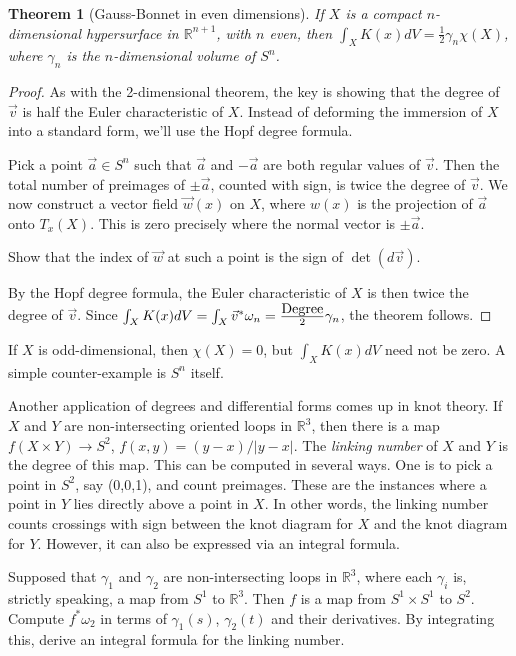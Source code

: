 \documentclass[12pt]{amsbook}
\newcommand{\R}{{\mathbb R}}
\newtheorem{thm}{Theorem}[section]
\theoremstyle{definition}
\begin{document}
\begin{thm}[Gauss-Bonnet in even dimensions] If $X$ is a compact $n$-dimensional hypersurface in $\R^{n+1}$, with $n$ even, then $\int_X K(x) dV =
\frac12 \gamma_n \chi(X)$, where $\gamma_n$ is the $n$-dimensional volume
of $S^n$. 
\end{thm}

\begin{proof} As with the 2-dimensional theorem, the key is showing that 
the degree of $\vec v$ is half the Euler characteristic of $X$. Instead of 
deforming the immersion of $X$ into a standard form, we'll use the Hopf 
degree formula. 

Pick a point $\vec a \in S^n$ such that $\vec a$ and $-\vec a$ 
are both regular values of 
$\vec v$. Then the total number of preimages of $\pm \vec a$, 
counted with sign,
is twice the degree of $\vec v$. We now construct a vector field $\vec w(x)$
on $X$, where $w(x)$ is the projection of $\vec a$ onto $T_x(X)$. This is 
zero precisely where the normal vector is $\pm \vec a$. 

 Show that the index of $\vec w$ at such a point is 
the sign of $\det (d \vec v)$. 

By the Hopf degree formula, the Euler characteristic of $X$ is then twice
the degree of $\vec v$. Since $\int_X K(x) dV = \int_X \vec v^* \omega_n
= \frac{\hbox{Degree}}{2} \gamma_n$, the theorem follows.

\end{proof}

If $X$ is odd-dimensional, then $\chi(X)=0$, but $\int_X K(x) dV$ need not
be zero. A simple counter-example is $S^n$ itself. 

Another application of degrees and differential forms comes up in knot 
theory.  If $X$ and $Y$ are
non-intersecting oriented loops in $\R^3$, then there is a map $f(X
\times Y) \to S^2$, $f(x,y) = (y-x)/|y-x|$. The {\em linking number}
of $X$ and $Y$ is the degree of this map. This can be computed in
several ways. One is to pick a point in $S^2$, say (0,0,1), and count
preimages. These are the instances where a point in $Y$ lies directly
above a point in $X$. In other words, the linking number counts
crossings with sign between the knot diagram for $X$ and the knot
diagram for $Y$.  However, it can also be expressed via an integral
formula.

 Supposed that $\gamma_1$ and $\gamma_2$ are
non-intersecting loops in $\R^3$, where each $\gamma_i$ is, strictly
speaking, a map from $S^1$ to $\R^3$. Then $f$ is a map from $S^1
\times S^1$ to $S^2$.  Compute $f^* \omega_2$ in terms of
$\gamma_1(s)$, $\gamma_2(t)$ and their derivatives.  By integrating
this, derive an integral formula for the linking number.

          
      
\end{document}
